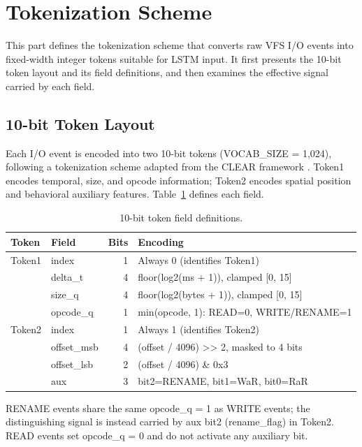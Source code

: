 \section{Tokenization Scheme}\label{sec:3.4}

This part defines the tokenization scheme that converts raw VFS I/\allowbreak{}O events into fixed-width integer tokens suitable for \textmu{}LSTM input. It first presents the 10-bit token layout and its field definitions, and then examines the effective signal carried by each field.

\subsection{10-bit Token Layout}\label{sec:3.4.1}

Each I/\allowbreak{}O event is encoded into two 10-bit tokens (VOCAB\_\allowbreak{}SIZE = 1,024), following a tokenization scheme adapted from the CLEAR framework \cite{ref9}. Token1 encodes temporal, size, and opcode information; Token2 encodes spatial position and behavioral auxiliary features. Table~\ref{tab:3-5} defines each field.

\begin{table}[htbp]
\centering
\small
\caption{10-bit token field definitions.}\label{tab:3-5}
\begin{tabularx}{\textwidth}{llrX}
\hline
\textbf{Token} & \textbf{Field} & \textbf{Bits} & \textbf{Encoding} \\
\hline
Token1 & index & 1 & Always 0 (identifies Token1) \\
 & delta\_\allowbreak{}t & 4 & floor(log2(ms + 1)), clamped [0, 15] \\
 & size\_\allowbreak{}q & 4 & floor(log2(bytes + 1)), clamped [0, 15] \\
 & opcode\_\allowbreak{}q & 1 & min(opcode, 1): READ=0, WRITE/\allowbreak{}RENAME=1 \\
Token2 & index & 1 & Always 1 (identifies Token2) \\
 & offset\_\allowbreak{}msb & 4 & (offset /\allowbreak{} 4096) \textgreater{}\textgreater{} 2, masked to 4 bits \\
 & offset\_\allowbreak{}lsb & 2 & (offset /\allowbreak{} 4096) \& 0x3 \\
 & aux & 3 & bit2=RENAME, bit1=WaR, bit0=RaR \\
\hline
\end{tabularx}
\end{table}

RENAME events share the same opcode\_\allowbreak{}q = 1 as WRITE events; the distinguishing signal is instead carried by aux bit2 (rename\_\allowbreak{}flag) in Token2. READ events set opcode\_\allowbreak{}q = 0 and do not activate any auxiliary bit.

